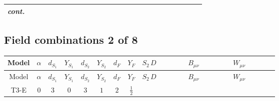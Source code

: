 \documentclass[8pt]{article}
\begin{document}
\begin{landscape}
\begin{longtable}{@{}cccccccc >{\raggedright\arraybackslash}p{0.21\linewidth} >{\raggedright\arraybackslash}p{0.21\linewidth} >{\raggedright\arraybackslash}p{0.21\linewidth}@{}}
\textit{cont.} &  &  &  &  &  &  &  & \scriptsize\adjustbox{max width=\linewidth}{$\begin{gathered} -\frac{2 \hbar  \overline{y_{1,i_1,r_1}} S_{1,j_3} S_{1,j_4} y_{1,i_1,r_1} S_{1,j_1}{}^{\dagger } S_{1,j_2}{}^{\dagger } \mathcal{I}_{S_1,j_1,j_3,j_2,j_4}{}^2 \lambda_{S_1}^{(1)}^{(2)}}{\sqrt{3} \epsilon } \\ -\frac{\hbar  \overline{y_{1,i_1,r_1}} S_{1,j_3} S_{1,j_4} y_{1,i_1,r_1} S_{1,j_1}{}^{\dagger } S_{1,j_2}{}^{\dagger } \mathcal{I}_{S_1,j_1,j_3,j_2,j_4}{}^2 \lambda_{S_1}^{(1)}^{(2)}}{\sqrt{3}}\end{gathered}$} &  & \scriptsize\adjustbox{max width=\linewidth}{$\begin{gathered} -\frac{2 \hbar  \overline{y_{2,i_1,r_1}} S_{2,j_3} S_{2,j_4} y_{2,i_1,r_1} S_{2,j_1}{}^{\dagger } S_{2,j_2}{}^{\dagger } \mathcal{I}_{S_2,j_1,j_3,j_2,j_4}{}^2 \lambda_{S_2}^{(1)}^{(2)}}{\sqrt{3} \epsilon } \\ -\frac{\hbar  \overline{y_{2,i_1,r_1}} S_{2,j_3} S_{2,j_4} y_{2,i_1,r_1} S_{2,j_1}{}^{\dagger } S_{2,j_2}{}^{\dagger } \mathcal{I}_{S_2,j_1,j_3,j_2,j_4}{}^2 \lambda_{S_2}^{(1)}^{(2)}}{\sqrt{3}}\end{gathered}$} \\
\midrule
\bottomrule
\end{longtable}
\clearpage
\subsection*{Field combinations 2 of 8}
\begin{longtable}{@{}cccccccc >{\raggedright\arraybackslash}p{0.21\linewidth} >{\raggedright\arraybackslash}p{0.21\linewidth} >{\raggedright\arraybackslash}p{0.21\linewidth}@{}}
\toprule
Model & $\alpha$ & $d_{S_1}$ & $Y_{S_1}$ & $d_{S_2}$ & $Y_{S_2}$ & $d_F$ & $Y_F$ & $S_2\,D$ & $B_{\mu\nu}$ & $W_{\mu\nu}$ \\
\midrule
\endfirsthead
\toprule
Model & $\alpha$ & $d_{S_1}$ & $Y_{S_1}$ & $d_{S_2}$ & $Y_{S_2}$ & $d_F$ & $Y_F$ & $S_2\,D$ & $B_{\mu\nu}$ & $W_{\mu\nu}$ \\
\midrule
\endhead
T3-E & $0$ & $3$ & $0$ & $3$ & $1$ & $2$ & $\frac{1}{2}$ & \scriptsize\adjustbox{max width=\linewidth}{$\begin{gathered} +D_{\mu _1}\left(S_{2,j_1}\right){}^{\dagger } D_{\mu _1}\left(S_{2,j_1}\right)\end{gathered}$} & \scriptsize\adjustbox{max width=\linewidth}{$\begin{gathered} -\frac{\hbar  B_{\mu _1\mu _2}^2}{2 \epsilon }\end{gathered}$} & \scriptsize\adjustbox{max width=\linewidth}{$\begin{gathered} -\frac{\hbar  \left(W_{\mu _1\mu _2}^{A_1}\right){}^2}{2 \epsilon }\end{gathered}$} \\
\midrule
\bottomrule
\end{longtable}
\clearpage

\end{landscape}
\end{document}
